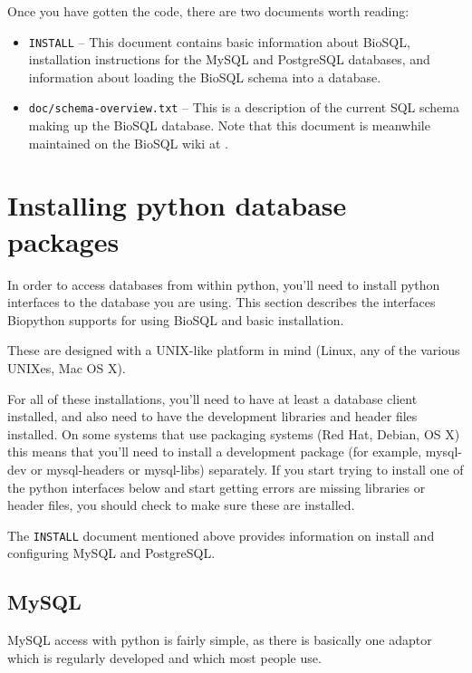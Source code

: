 \documentclass{article}
\begin{document}
Once you have gotten the code, there are two documents worth reading:

\begin{itemize}
  \item \verb|INSTALL| -- This document contains basic information
  about BioSQL, installation instructions for the MySQL and PostgreSQL
  databases, and information about loading the BioSQL schema into a
  database.

  \item \verb|doc/schema-overview.txt| -- This is a description of the
  current SQL schema making up the BioSQL database. Note that this document is meanwhile maintained on the BioSQL wiki at .
\end{itemize}

\section{Installing python database packages}

In order to access databases from within python, you'll need to install
python interfaces to the database you are using. This section describes
the interfaces Biopython supports for using BioSQL and basic
installation.

These are designed with a UNIX-like platform in mind (Linux, any of the
various UNIXes, Mac OS X).

For all of these installations, you'll need to have at least a database
client installed, and also need to have the development libraries and
header files installed. On some systems that use packaging systems
(Red Hat, Debian, OS X) this means that you'll need to install a
development package (for example, mysql-dev or mysql-headers or 
mysql-libs) separately. If you start trying to install one of the python
interfaces below and start getting errors are missing libraries or
header files, you should check to make sure these are installed.

The \verb|INSTALL| document mentioned above provides information on
install and configuring MySQL and PostgreSQL.

\subsection{MySQL}

MySQL access with python is fairly simple, as there is basically one
adaptor which is regularly developed and which most people use.
\end{document}
